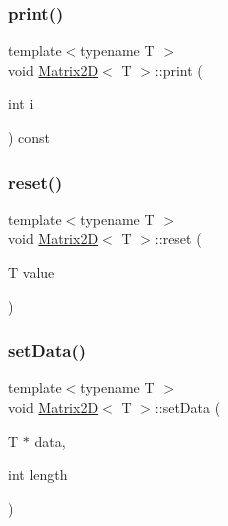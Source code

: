 \mbox{\label{classMatrix2D_a27ccf42f23c568b2397b744ec32a41d1}} 
\subsubsection{\texorpdfstring{print()}{print()}}
{\footnotesize\ttfamily template$<$typename T $>$ \\
void \mbox{\hyperlink{classMatrix2D}{Matrix2D}}$<$ T $>$\+::print (\begin{DoxyParamCaption}\item[{int}]{i }\end{DoxyParamCaption}) const}

\mbox{\label{classMatrix2D_a1a646829a2e9d166e0e47439de633b95}} 
\subsubsection{\texorpdfstring{reset()}{reset()}}
{\footnotesize\ttfamily template$<$typename T $>$ \\
void \mbox{\hyperlink{classMatrix2D}{Matrix2D}}$<$ T $>$\+::reset (\begin{DoxyParamCaption}\item[{T}]{value }\end{DoxyParamCaption})}

\mbox{\label{classMatrix2D_a28515c515652637734a22a3440e80258}} 
\subsubsection{\texorpdfstring{set\+Data()}{setData()}}
{\footnotesize\ttfamily template$<$typename T $>$ \\
void \mbox{\hyperlink{classMatrix2D}{Matrix2D}}$<$ T $>$\+::set\+Data (\begin{DoxyParamCaption}\item[{T $\ast$}]{data,  }\item[{int}]{length }\end{DoxyParamCaption})}

\mbox{\label{classMatrix2D_a4c959b3c3807e9ca4d8d62f3e516b933}} 
